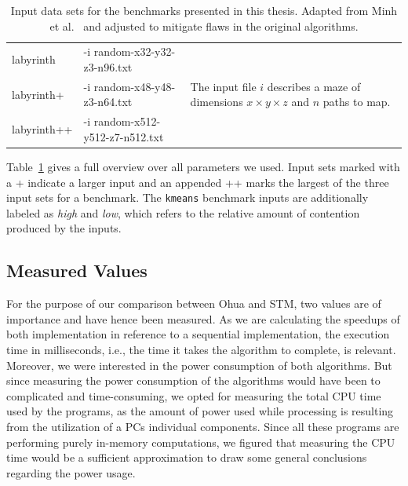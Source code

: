\begin{table}
\begin{tabular}{|l l l|}
        labyrinth & -i random-x32-y32-z3-n96.txt & \multirow{3}{*}{\begin{minipage}{.4\textwidth}The input file $i$ describes a maze of dimensions $x \times y \times z$ and $n$ paths to map.\end{minipage}}\\
        labyrinth+ & -i random-x48-y48-z3-n64.txt & \\
        labyrinth++ & -i random-x512-y512-z7-n512.txt & \\\hline
    \end{tabular}

    \caption{Input data sets for the benchmarks presented in this thesis. Adapted from Minh et al.~\cite{minh2008stamp} and adjusted to mitigate flaws in the original algorithms.}
    \label{tab:experiments:inputs}
\end{table}

Table~\ref{tab:experiments:inputs} gives a full overview over all parameters we used.
Input sets marked with a + indicate a larger input and an appended ++ marks the largest of the three input sets for a benchmark.
The \texttt{kmeans} benchmark inputs are additionally labeled as \emph{high} and \emph{low}, which refers to the relative amount of contention produced by the inputs.

\subsection{Measured Values}
\label{sec:experiments:measurements:values}

For the purpose of our comparison between Ohua and STM, two values are of importance and have hence been measured.
As we are calculating the speedups of both implementation in reference to a sequential implementation, the execution time in milliseconds, i.e., the time it takes the algorithm to complete, is relevant.
Moreover, we were interested in the power consumption of both algorithms.
But since measuring the power consumption of the algorithms would have been to complicated and time-consuming, we opted for measuring the total CPU time used by the programs, as the amount of power used while processing is resulting from the utilization of a PCs individual components.
Since all these programs are performing purely in-memory computations, we figured that measuring the CPU time would be a sufficient approximation to draw some general conclusions regarding the power usage.

